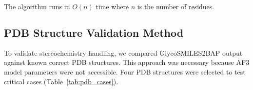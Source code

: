 \noindent The algorithm runs in $O(n)$ time where $n$ is the number of residues.

\subsection{PDB Structure Validation Method}

To validate stereochemistry handling, we compared GlycoSMILES2BAP output against known correct PDB structures. This approach was necessary because AF3 model parameters were not accessible. Four PDB structures were selected to test critical cases (Table~\ref{tab:pdb_cases}).

